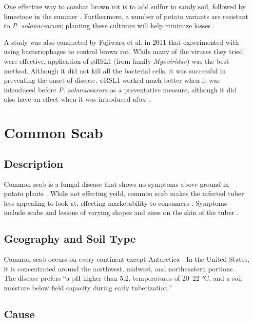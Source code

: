 \documentclass[letterpaper, 12pt]{report}
\begin{document}
One effective way to combat brown rot is to add sulfur to sandy soil, followed by limestone in the summer \autocite{rich2013potato}. Furthermore, a number of potato variants are resistant to \emph{P. solanacearum}; planting these cultivars will help minimize losses \autocite{rich2013potato}.

A study was also conducted by Fujiwara et al. in 2011 that experimented with using bacteriophages to control brown rot. While many of the viruses they tried were effective, application of {$\phi$}RSL1 (from family \emph{Myoviridae}) was the best method. Although it did not kill all the bacterial cells, it was successful in preventing the onset of disease. {$\phi$}RSL1 worked much better when it was introduced before \emph{P. solanacearum} as a preventative measure, although it did also have an effect when it was introduced after \autocite{fujiwara2011biocontrol}.


\section{Common Scab}

\subsection{Description}

Common scab is a fungal disease that shows no symptoms above ground in potato plants \autocite{rich2013potato}. While not effecting yeild, common scab makes the infected tuber less appealing to look at, effecting marketability to consumers \autocite{rich2013potato}. Symptoms include scabs and lesions of varying shapes and sizes on the skin of the tuber \autocite{dees2012search}.

\subsection{Geography and Soil Type}

Common scab occurs on every continent except Antarctica \autocite{rich2013potato}. In the United States, it is concentrated around the northwest, midwest, and northeastern portions \autocite{braun2017potato}. The disease prefers ``a pH
higher than 5.2, temperatures of 20–22 °C, and a soil moisture
below field capacity during early tuberization.'' \autocite{braun2017potato, archuleta1981cause}

\subsection{Cause}
\end{document}
